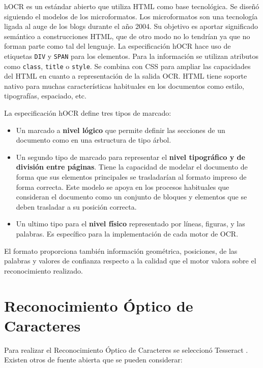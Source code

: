 hOCR es un estándar abierto que utiliza HTML como base tecnológica. Se diseñó siguiendo el modelos de los microformatos. Los microformatos son una tecnología ligada al auge de los blogs durante el año 2004. Su objetivo es aportar significado semántico a construcciones HTML, que de otro modo no lo tendrían ya que no forman parte como tal del lenguaje. La especificación hOCR hace uso de etiquetas \verb|DIV| y \verb|SPAN| para los elementos. Para la información se utilizan atributos como \verb|class|, \verb|title| o \verb|style|. Se combina con CSS para ampliar las capacidades del HTML en cuanto a representación de la salida OCR. HTML tiene soporte nativo para muchas características habituales en los documentos como estilo, tipografías, espaciado, etc.

La especificación hOCR define tres tipos de marcado:

\begin{itemize}
    \item Un marcado a \textbf{nivel lógico} que permite definir las secciones de un documento como en una estructura de tipo árbol.
    \item Un segundo tipo de marcado para representar el \textbf{nivel tipográfico y de división entre páginas}. Tiene la capacidad de modelar el documento de forma  que sus elementos principales se trasladarían al formato impreso de forma correcta. Este modelo se apoya en los procesos habituales que consideran el documento como un conjunto de bloques y elementos que se deben trasladar a su posición correcta.
    \item Un ultimo tipo para el \textbf{nivel físico} representado por líneas, figuras, y las palabras. Es específico para la implementación de cada motor de OCR. 
\end{itemize}

El formato proporciona también información geométrica, posiciones, de las palabras y valores de confianza respecto a la calidad que el motor valora sobre el reconocimiento realizado.

\section{Reconocimiento Óptico de Caracteres}
\label{sec:rec-optico-caracteres}

Para realizar el Reconocimiento Óptico de Caracteres se seleccionó Tesseract \cite{ocr_tesseract_raysmithetal.TesseractocrTesseract2021}. Existen otros de fuente abierta que se pueden considerar:

